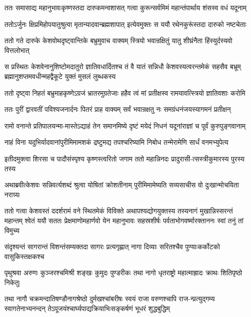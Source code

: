 \twolineshloka
{ततः समासाद्य महानुभावःकृष्णस्तदा दारुकमन्वशासत्}
{गत्वा कुरून्सर्वमिमं महान्तंपार्थाय शंसस्व वधं यदूनाम्}


\twolineshloka
{ततोऽर्जुनः क्षिप्रमिहोपयातुश्रुत्वा मृतान्यादवान्ब्रह्मशापात्}
{इत्येवमुक्तः स ययौ रथेनकुरूंस्तदा दारुको नष्टचेताः}


\twolineshloka
{ततो गते दारुके केशवोथदृष्ट्वान्तिके बभ्रुमुवाच वाक्यम्}
{स्त्रियो भवान्रक्षितुं यातु शीघ्रंनैता हिंस्युर्दस्यवो वित्तलोभात्}


\threelineshloka
{स प्रस्थितः केशवेनानुशिष्टोमदातुरो ज्ञातिवधार्दितश्च}
{तं वै यातं सन्निधौ केशवस्यत्वरन्तमेकं सहसैव बभ्रूम्}
{ब्रह्मानुशप्तमवधीन्महद्वैकूटे युक्तं मुसलं लुब्धकस्य}


\twolineshloka
{ततो दृष्ट्वा निहतं बभ्रुमाहकृष्णेऽग्रजं भ्रातरमुग्रतेजाः}
{हहैव त्वं मां प्रतीक्षस्व रामयावत्स्त्रियो ज्ञातिवशाः करोमि}


\twolineshloka
{ततः पुरीं द्वारवतीं पविश्यजनार्दनः पितरं प्राह वाक्यम्}
{सर्वं भवान्रक्षतु नः समग्रंधनंजयस्यागमनं प्रतीक्षन्}


\twolineshloka
{रामो वनान्ते प्रतिपालयन्मा-मास्तेऽद्याहं तेन समानमिष्ये}
{दृष्टं मयेदं निधनं यदूनांराज्ञां च पूर्वं कुरुपुङ्गवानाम्}


\twolineshloka
{नाहं विना यदुभिर्यादवानांपुरीमिमामशकं द्रष्टुमद्य}
{तपश्चरिष्यामि निबोध तन्मेरामेणि सार्धं वनमभ्युपेत्य}


\twolineshloka
{इतीदमुक्त्वा शिरसा च पादौसंस्पृश्य कृष्णस्त्वरितो जगाम}
{ततो महान्निनदः प्रादुरासी-त्सस्त्रीकुमारस्य पुरस्य तस्य}


\twolineshloka
{अथाब्रवीत्केशवः सन्निवर्त्यशब्दं श्रुत्वा योषितां क्रोशतीनाम्}
{पुरीमिमामेष्यति सव्यसाचीस वो दुःखान्मोचयिता नराग्र्यः}


ततो गत्वा केशवस्तं ददर्शरामं वने स्थितमेकं विविक्ते
\threelineshloka
{अथापश्यद्योगयुक्तस्य तस्यनागं मुखान्निस्सरन्तं महान्तम्}
{श्वेतं ययौ सततः प्रेक्षमाणोमहार्णवो येन महानुभावः}
{सहस्रशीर्षः पर्वताभोगवर्ष्मारक्ताननः स्वां तनुं तां विमुच्य}


\twolineshloka
{संदृश्यन्तं सागरान्तं विशन्तंसम्यक्तदा सागरः प्रत्यगृह्णात्}
{नागा दिव्याः सरितश्चैव पुण्याःकर्कोटको वासुकिस्तक्षकश्च}


\twolineshloka
{पृथुश्रवा अरुणः कुञ्जरश्चमिश्री शङ्खः कुमुदः पुण्डरीकः}
{तथा नागो धृतराष्ट्रो महात्माह्रादः क्राथः शितिपृष्ठो निकेतुः}


\threelineshloka
{तथा नागौ चक्रमन्दातिषण्डौनागश्रेष्ठो दुर्मखश्चांबरीषः}
{स्वयं राजा वरुणश्चापि राज-न्प्रत्युद्गम्य स्वागतेनाभ्यनन्दन्}
{तेऽपूजयंश्चार्घ्यपाद्यक्रियाभिःसङ्कर्षणं भूधरं शुद्धबुद्धिम्}


